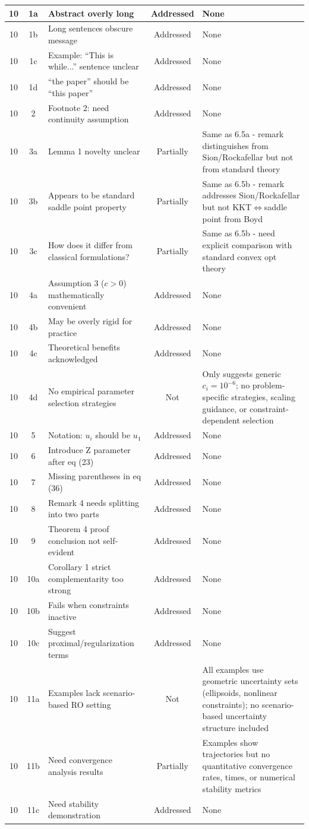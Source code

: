 \documentclass[journal,twoside,web]{ieeecolor}
\begin{document}
\begin{longtable}{|c|c|p{5.5cm}|c|p{3.5cm}|}
10 & 1a & Abstract overly long & Addressed & None \\
\hline
10 & 1b & Long sentences obscure message & Addressed & None \\
\hline
10 & 1c & Example: ``This is while...'' sentence unclear & Addressed & None \\
\hline
10 & 1d & ``the paper'' should be ``this paper'' & Addressed & None \\
\hline
10 & 2 & Footnote 2: need continuity assumption & Addressed & None \\
\hline
10 & 3a & Lemma 1 novelty unclear & Partially & Same as 6.5a - remark distinguishes from Sion/Rockafellar but not from standard theory \\
\hline
10 & 3b & Appears to be standard saddle point property & Partially & Same as 6.5b - remark addresses Sion/Rockafellar but not KKT$\Leftrightarrow$saddle point from Boyd \\
\hline
10 & 3c & How does it differ from classical formulations? & Partially & Same as 6.5b - need explicit comparison with standard convex opt theory \\
\hline
10 & 4a & Assumption 3 ($c>0$) mathematically convenient & Addressed & None \\
\hline
10 & 4b & May be overly rigid for practice & Addressed & None \\
\hline
10 & 4c & Theoretical benefits acknowledged & Addressed & None \\
\hline
10 & 4d & No empirical parameter selection strategies & Not & Only suggests generic $c_i=10^{-6}$; no problem-specific strategies, scaling guidance, or constraint-dependent selection \\
\hline
10 & 5 & Notation: $u_i$ should be $u_1$ & Addressed & None \\
\hline
10 & 6 & Introduce Z parameter after eq (23) & Addressed & None \\
\hline
10 & 7 & Missing parentheses in eq (36) & Addressed & None \\
\hline
10 & 8 & Remark 4 needs splitting into two parts & Addressed & None \\
\hline
10 & 9 & Theorem 4 proof conclusion not self-evident & Addressed & None \\
\hline
10 & 10a & Corollary 1 strict complementarity too strong & Addressed & None \\
\hline
10 & 10b & Fails when constraints inactive & Addressed & None \\
\hline
10 & 10c & Suggest proximal/regularization terms & Addressed & None \\
\hline
10 & 11a & Examples lack scenario-based RO setting & Not & All examples use geometric uncertainty sets (ellipsoids, nonlinear constraints); no scenario-based uncertainty structure included \\
\hline
10 & 11b & Need convergence analysis results & Partially & Examples show trajectories but no quantitative convergence rates, times, or numerical stability metrics \\
\hline
10 & 11c & Need stability demonstration & Addressed & None \\
\hline


\end{longtable}
\end{document}
